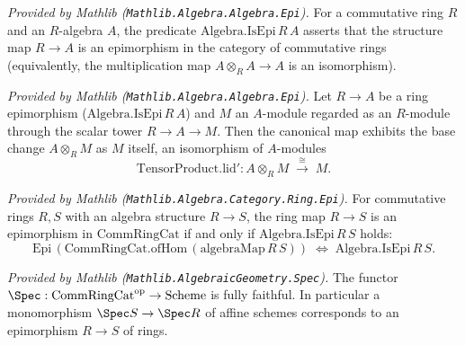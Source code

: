 \begin{definition}
  \label{lem:mathlib_algebra_isEpi}
  \mathlibok
  \textit{Provided by Mathlib (\texttt{Mathlib.Algebra.Algebra.Epi}).}
  For a commutative ring \(R\) and an \(R\)-algebra \(A\), the predicate
  \(\mathrm{Algebra.IsEpi}\,R\,A\) asserts that the structure map \(R \to A\) is an
  epimorphism in the category of commutative rings (equivalently, the multiplication map
  \(A \otimes_R A \to A\) is an isomorphism).
\end{definition}

\begin{lemma}
  \label{lem:mathlib_tensorProduct_lid_epi}
  \mathlibok
  \textit{Provided by Mathlib (\texttt{Mathlib.Algebra.Algebra.Epi}).}
  Let \(R \to A\) be a ring epimorphism (\(\mathrm{Algebra.IsEpi}\,R\,A\)) and \(M\) an
  \(A\)-module regarded as an \(R\)-module through the scalar tower \(R \to A \to M\). Then
  the canonical map exhibits the base change \(A \otimes_R M\) as \(M\) itself, an
  isomorphism of \(A\)-modules
  \[
    \mathrm{TensorProduct.lid'} : A \otimes_R M \;\xrightarrow{\ \cong\ }\; M .
  \]
\end{lemma}

\begin{lemma}
  \label{lem:mathlib_commRingCat_epi_iff_epi}
  \mathlibok
  \textit{Provided by Mathlib (\texttt{Mathlib.Algebra.Category.Ring.Epi}).}
  For commutative rings \(R, S\) with an algebra structure \(R \to S\), the ring map
  \(R \to S\) is an epimorphism in \(\mathrm{CommRingCat}\) if and only if
  \(\mathrm{Algebra.IsEpi}\,R\,S\) holds:
  \[
    \mathrm{Epi}\,(\mathrm{CommRingCat.ofHom}\,(\mathrm{algebraMap}\,R\,S))
      \;\Longleftrightarrow\; \mathrm{Algebra.IsEpi}\,R\,S .
  \]
\end{lemma}

\begin{lemma}
  \label{lem:mathlib_spec_fullyFaithful}
  \mathlibok
  \textit{Provided by Mathlib (\texttt{Mathlib.AlgebraicGeometry.Spec}).}
  The functor \(\Spec : \mathrm{CommRingCat}^{\mathrm{op}} \to \mathrm{Scheme}\) is fully
  faithful. In particular a monomorphism \(\Spec S \to \Spec R\) of affine schemes
  corresponds to an epimorphism \(R \to S\) of rings.
\end{lemma}

